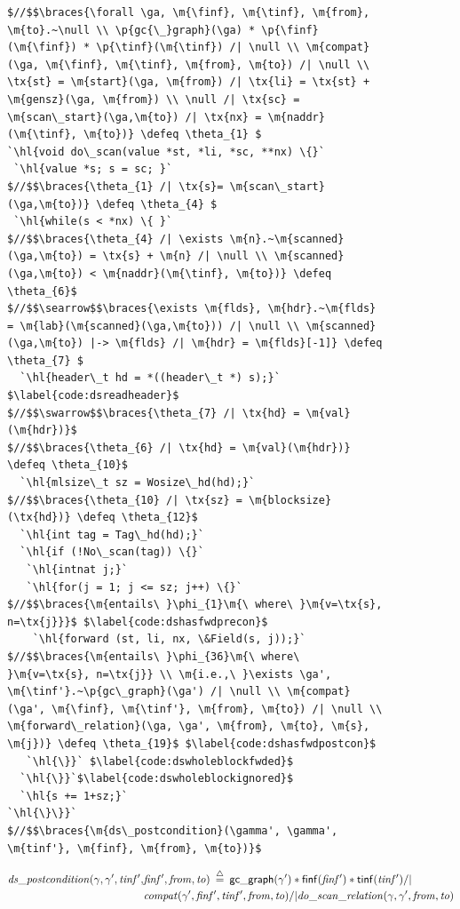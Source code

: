 \documentclass[acmsmall,screen]{acmart}  %
\makeatletter
\newcommand{\finf}{finf} %
\newcommand{\tinf}{tinf} %
\newcommand{\braces}[1]{\left\{\!\!\!\begin{array}{l@{}} #1 \end{array}\right\}} %
\newcommand{\ga}{\gamma} %
\newcommand{\defeq}{\mathbin{\stackrel{\triangle}{=}}} %
\newcommand{\tx}[1]{\text{#1}}
\newcommand{\p}[1]{\ensuremath{\mathsf{#1}}} \newcommand{\m}[1]{\ensuremath{\mathit{#1}}} \newcommand{\ma}[1]{\ensuremath{\mathcal{#1}}} \let\ramify\lightning
\newcommand{\hl}[1]{\colorbox{lightgray}{#1}} %
\providecommand{\DIFaddbeginFL}{} %
\providecommand{\DIFdelendFL}{} %
\newcommand{\DIFaddincludegraphics}[2][]{{\color{blue}\fbox{\DIFOincludegraphics[#1]{#2}}}} %
\DeclareRobustCommand{\DIFaddbeginFL}{\DIFOaddbeginFL \let\includegraphics\DIFaddincludegraphics} %
\DeclareRobustCommand{\DIFdelendFL}{\DIFOaddendFL \let\includegraphics\DIFOincludegraphics} %
\makeatother
\begin{document}
\begin{figure}[t]
{\color{blue}
\DIFdelendFL \DIFaddbeginFL \begin{lstlisting}[multicols = 2]
$//$$\braces{\forall \ga, \m{\finf}, \m{\tinf}, \m{from}, \m{to}.~\null \\ \p{gc{\_}graph}(\ga) * \p{\finf}(\m{\finf}) * \p{\tinf}(\m{\tinf}) /| \null \\ \m{compat}(\ga, \m{\finf}, \m{\tinf}, \m{from}, \m{to}) /| \null \\ \tx{st} = \m{start}(\ga, \m{from}) /| \tx{li} = \tx{st} + \m{gensz}(\ga, \m{from}) \\ \null /| \tx{sc} = \m{scan\_start}(\ga,\m{to}) /| \tx{nx} = \m{naddr}(\m{\tinf}, \m{to})} \defeq \theta_{1} $
`\hl{void do\_scan(value *st, *li, *sc, **nx) \{}`
 `\hl{value *s; s = sc; }`
$//$$\braces{\theta_{1} /| \tx{s}= \m{scan\_start}(\ga,\m{to})} \defeq \theta_{4} $
 `\hl{while(s < *nx) \{ }`
$//$$\braces{\theta_{4} /| \exists \m{n}.~\m{scanned}(\ga,\m{to}) = \tx{s} + \m{n} /| \null \\ \m{scanned}(\ga,\m{to}) < \m{naddr}(\m{\tinf}, \m{to})} \defeq \theta_{6}$
$//$$\searrow$$\braces{\exists \m{flds}, \m{hdr}.~\m{flds} = \m{lab}(\m{scanned}(\ga,\m{to})) /| \null \\ \m{scanned}(\ga,\m{to}) |-> \m{flds} /| \m{hdr} = \m{flds}[-1]} \defeq \theta_{7} $
  `\hl{header\_t hd = *((header\_t *) s);}` $\label{code:dsreadheader}$
$//$$\swarrow$$\braces{\theta_{7} /| \tx{hd} = \m{val}(\m{hdr})}$
$//$$\braces{\theta_{6} /| \tx{hd} = \m{val}(\m{hdr})} \defeq \theta_{10}$
  `\hl{mlsize\_t sz = Wosize\_hd(hd);}`
$//$$\braces{\theta_{10} /| \tx{sz} = \m{blocksize}(\tx{hd})} \defeq \theta_{12}$
  `\hl{int tag = Tag\_hd(hd);}`
  `\hl{if (!No\_scan(tag)) \{}`
   `\hl{intnat j;}`
   `\hl{for(j = 1; j <= sz; j++) \{}`
$//$$\braces{\m{entails\ }\phi_{1}\m{\ where\ }\m{v=\tx{s}, n=\tx{j}}}$ $\label{code:dshasfwdprecon}$
    `\hl{forward (st, li, nx, \&Field(s, j));}` 
$//$$\braces{\m{entails\ }\phi_{36}\m{\ where\ }\m{v=\tx{s}, n=\tx{j}} \\ \m{i.e.,\ }\exists \ga', \m{\tinf'}.~\p{gc\_graph}(\ga') /| \null \\ \m{compat}(\ga', \m{\finf}, \m{\tinf'}, \m{from}, \m{to}) /| \null \\ \m{forward\_relation}(\ga, \ga', \m{from}, \m{to}, \m{s}, \m{j})} \defeq \theta_{19}$ $\label{code:dshasfwdpostcon}$
   `\hl{\}}` $\label{code:dswholeblockfwded}$
  `\hl{\}}`$\label{code:dswholeblockignored}$
  `\hl{s += 1+sz;}`
`\hl{\}\}}`
$//$$\braces{\m{ds\_postcondition}(\gamma', \gamma', \m{tinf'}, \m{finf}, \m{from}, \m{to})}$
\end{lstlisting}}
\footnotesize{
\vspace{-0.8em}
\begin{equation*}
\begin{split}
\m{ds\_postcondition}(\gamma, \ga', \m{tinf'}, &\m{finf'}, \m{from}, \m{to}) \; \defeq \; 
   \p{gc{\_}graph}(\ga') * \p{\finf}(\m{\finf'}) * \p{\tinf}(\m{\tinf'}) /| \null \\
   &\m{compat}(\ga', \m{\finf'}, \m{\tinf'}, \m{from}, \m{to}) /|
   \m{do\_scan\_relation}(\ga, \ga', \m{from}, \m{to})
\end{split}
\end{equation*}

}
\end{figure}
\end{document}
